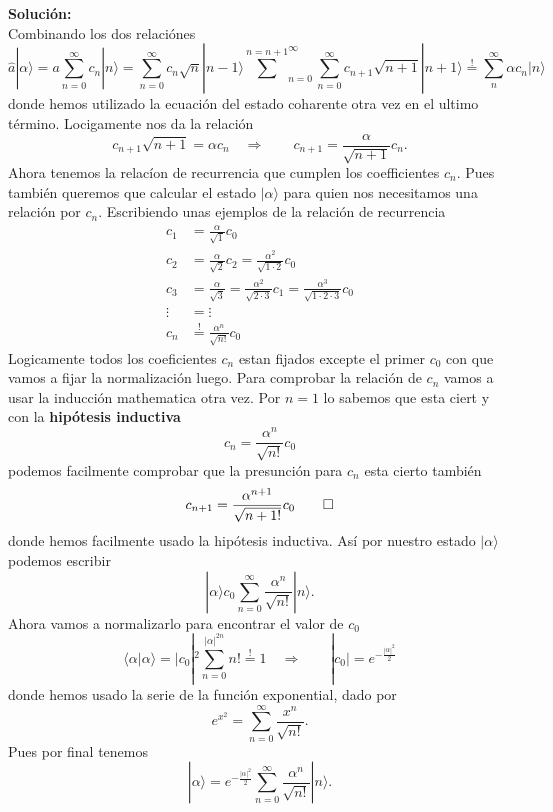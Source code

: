  \\\\
\textbf{Solución:} \\
Combinando los dos relaciónes 
$$
	\hat a | \alpha \rangle = a \sum_{n=0}^\infty c_n | n\rangle =
\sum_{n=0}^\infty c_n \sqrt n | n-1\rangle \overset{n=n+1} \sum_{n=0}^\infty
\sum_{n=0}^\infty c_{n+1} \sqrt{n+1} |n+1\rangle \overset{!}{=} \sum_n^\infty
\alpha c_n | n\rangle
$$
donde hemos utilizado la ecuación del estado coharente otra vez en el ultimo
término. Locigamente nos da la relación
$$
	c_{n+1} \sqrt{n+1} = \alpha c_n \quad \Rightarrow \qquad c_{n+1} =
\frac{\alpha}{\sqrt{n+1}} c_n.
$$
Ahora tenemos la relacíon de recurrencia que cumplen los coefficientes $c_n$.
Pues también queremos que calcular el estado $|\alpha\rangle$ para quien nos
necesitamos una relación por $c_n$. Escribiendo unas ejemplos de la relación de
recurrencia 
\begin{align*}
	c_1 &= \frac{\alpha}{\sqrt 1} c_0 \\
	c_2 &= \frac{\alpha}{\sqrt 2} c_2 = \frac{\alpha^2}{\sqrt{1\cdot 2}} c_0 \\
	c_3 &= \frac{\alpha}{\sqrt 3} = \frac{\alpha^2}{\sqrt{2 \cdot 3}} c_1 =
\frac{\alpha^3}{\sqrt{1 \cdot 2 \cdot 3}} c_0 \\
	\vdots &= \vdots \\
	c_n &\overset{!}{=} \frac{\alpha^n}{\sqrt{n!}} c_0
\end{align*}
Logicamente todos los coeficientes $c_n$ estan fijados excepte el primer $c_0$
con que vamos a fijar la normalización luego. Para comprobar la relación de
$c_n$ vamos a usar la inducción mathematica otra vez. Por $n=1$ lo sabemos que
esta ciert y con la  \textbf{hipótesis
inductiva} 
$$
	c_n = \frac{\alpha^n}{\sqrt{n!}} c_0
$$
podemos facilmente comprobar que la presunción para $c_n$ esta cierto también
$$
	c_{n+1} = \frac{\alpha^{n+1}}{\sqrt{n+1!}} c_0 \qed
$$
donde hemos facilmente usado la hipótesis inductiva. Así por nuestro estado
$|\alpha\rangle$ podemos escribir
$$
	|\alpha\rangle c_0 \sum_{n=0}^\infty \frac{\alpha^n}{\sqrt{n!}} | n\rangle.
$$
Ahora vamos a normalizarlo para encontrar el valor de $c_0$
$$
	\langle \alpha | \alpha \rangle = | c_0 |^2 \sum_{n=0}^{|\alpha|^{2n}}{n!}
\overset{!}{=} 1 \quad \Rightarrow \qquad |c_0| = e^{- \frac{|\alpha|^2}{2}}
$$
donde hemos usado la serie de la función exponential, dado por
$$
	e^{x^2} = \sum_{n=0}^\infty \frac{x^n}{\sqrt{n!}}.
$$
Pues por final tenemos
$$
	|\alpha \rangle = e^{- \frac{|\alpha|^2}{2}} \sum_{n=0}^\infty
\frac{\alpha^n}{\sqrt{n!}} | n\rangle.
$$


